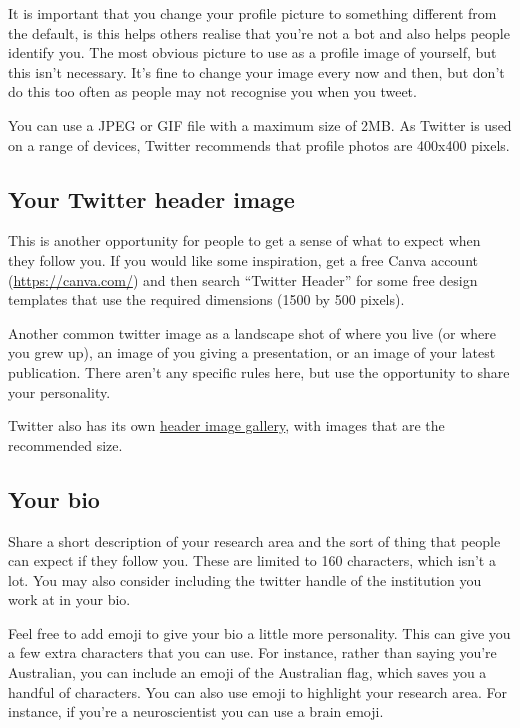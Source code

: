 \documentclass[]{book}
\begin{document}
It is important that you change your profile picture to something different from the default, is this helps others realise that you're not a bot and also helps people identify you. The most obvious picture to use as a profile image of yourself, but this isn't necessary. It's fine to change your image every now and then, but don't do this too often as people may not recognise you when you tweet.

You can use a JPEG or GIF file with a maximum size of 2MB. As Twitter is used on a range of devices, Twitter recommends that profile photos are 400x400 pixels.

\hypertarget{your-twitter-header-image}{%
\subsection{Your Twitter header image}\label{your-twitter-header-image}}

This is another opportunity for people to get a sense of what to expect when they follow you. If you would like some inspiration, get a free Canva account (\url{https://canva.com/}) and then search ``Twitter Header'' for some free design templates that use the required dimensions (1500 by 500 pixels).

Another common twitter image as a landscape shot of where you live (or where you grew up), an image of you giving a presentation, or an image of your latest publication. There aren't any specific rules here, but use the opportunity to share your personality.

Twitter also has its own \href{https://www.flickr.com/photos/twitteroffice/sets/72157643560484885/}{header image gallery}, with images that are the recommended size.

\hypertarget{your-bio}{%
\subsection{Your bio}\label{your-bio}}

Share a short description of your research area and the sort of thing that people can expect if they follow you. These are limited to 160 characters, which isn't a lot. You may also consider including the twitter handle of the institution you work at in your bio.

Feel free to add emoji to give your bio a little more personality. This can give you a few extra characters that you can use. For instance, rather than saying you're Australian, you can include an emoji of the Australian flag, which saves you a handful of characters. You can also use emoji to highlight your research area. For instance, if you're a neuroscientist you can use a brain emoji.
\end{document}
